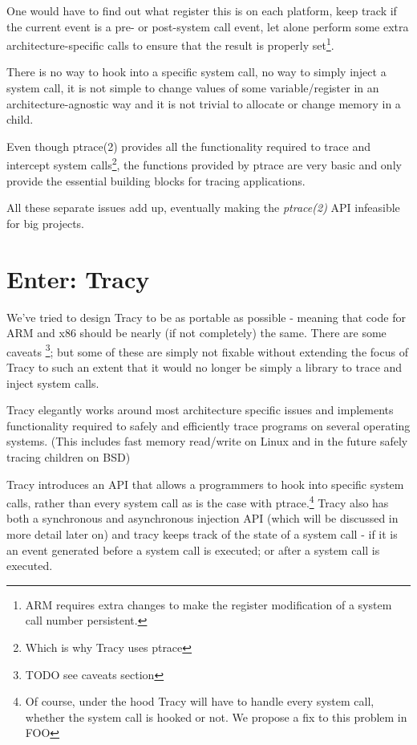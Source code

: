 \documentclass[a4paper, twoside, 10pt, twocolumn]{report}
\begin{document}
One would have to find out what register this is on each platform,
keep track if the current event is a pre- or post-system call event, let alone
perform some extra architecture-specific calls to ensure that the result is
properly set\footnote{ARM requires extra changes to make the register
modification of a system call number persistent.}.

There is no way to hook into a specific system call, no way
to simply inject a system call, it is not simple to change values of some
variable/register in an architecture-agnostic way and it is not trivial
to allocate or change memory in a child.

Even though ptrace(2) provides all the functionality required to trace and
intercept system calls\footnote{Which is why Tracy uses ptrace},
the functions provided by ptrace are very basic and only provide the
essential building blocks for tracing applications.

All these separate issues add up, eventually making the \textit{ptrace(2)} API
infeasible for big projects. %

\section{Enter: Tracy}

We've tried to design Tracy to be as portable as possible - meaning that code
for ARM and x86 should be nearly (if not completely) the same. There are some
caveats \footnote{TODO see caveats section}; but some of these are simply not
fixable without extending the focus of Tracy to such an extent that it would no
longer be simply a library to trace and inject system calls.

Tracy elegantly works around most architecture specific issues and implements
functionality required to safely and efficiently trace programs on several
operating systems. (This includes fast memory read/write on Linux
and in the future safely tracing children on BSD)

Tracy introduces an API that allows a programmers to hook into specific system
calls, rather than every system call as is the case with ptrace.\footnote{Of
course, under the hood Tracy will have to handle every system call, whether
the system call is hooked or not. We propose a fix to this problem in FOO}%
Tracy also has both a synchronous and asynchronous injection API (which
will be discussed in more detail later on) and tracy keeps track of the state of
a system call - if it is an event generated before a system call is executed; or
after a system call is executed.
\end{document}
